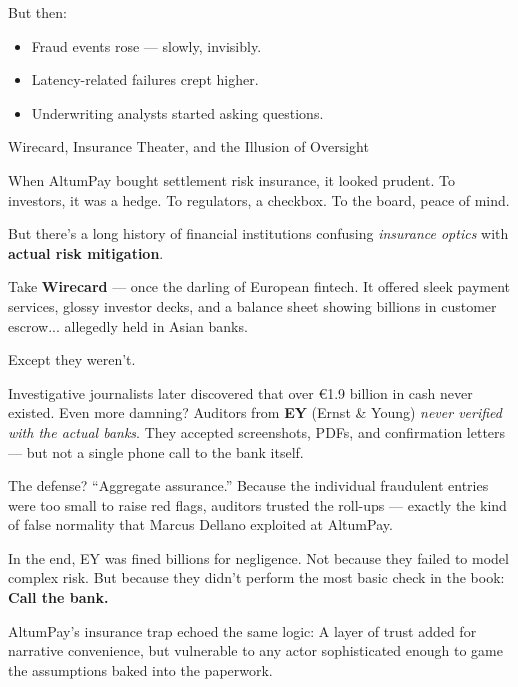 But then:

\begin{itemize}
\item Fraud events rose --- slowly, invisibly.
\item Latency-related failures crept higher.
\item Underwriting analysts started asking questions.
\end{itemize}

\begin{HistoricalSidebar}{Wirecard, Insurance Theater, and the Illusion of Oversight}

    When AltumPay bought settlement risk insurance, it looked prudent.  
    To investors, it was a hedge.  
    To regulators, a checkbox.  
    To the board, peace of mind.
    
    \medskip
    
    But there’s a long history of financial institutions confusing \textit{insurance optics} with 
    \textbf{actual risk mitigation}.
    
    \medskip
    
    Take \textbf{Wirecard} --- once the darling of European fintech.  
    It offered sleek payment services, glossy investor decks, and a balance sheet showing billions in customer 
    escrow... allegedly held in Asian banks.

    \medskip
    
    Except they weren’t.

    \medskip
    
    Investigative journalists later discovered that over €1.9 billion in cash never existed.  
    Even more damning? Auditors from \textbf{EY} (Ernst \& Young) \textit{never verified with the actual banks}.  
    They accepted screenshots, PDFs, and confirmation letters — but not a single phone call to the bank itself.
    
    \medskip
    
    The defense?  
    “Aggregate assurance.”  
    Because the individual fraudulent entries were too small to raise red flags, auditors trusted the roll-ups —  
    exactly the kind of false normality that Marcus Dellano exploited at AltumPay.
    
    \medskip
    
    In the end, EY was fined billions for negligence.  
    Not because they failed to model complex risk.  
    But because they didn’t perform the most basic check in the book:  
    \textbf{Call the bank.}
    
    \medskip
    
    AltumPay’s insurance trap echoed the same logic:  
    A layer of trust added for narrative convenience,  but vulnerable to any actor sophisticated enough to game 
    the assumptions baked into the paperwork.
    
\end{HistoricalSidebar}
    

